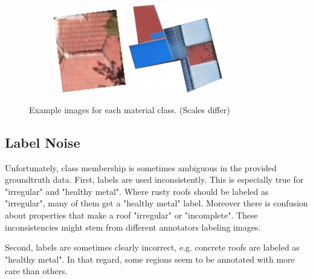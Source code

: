 \documentclass[11pt]{article}
\begin{document}
\begin{figure}
\begin{subfigure}[c]{0.32\textwidth}
		\end{subfigure}
		\begin{subfigure}[c]{0.32\textwidth}
			\centering
			\includegraphics[width=0.35\textwidth]{figures/mat_examples/other1.png}		
			\includegraphics[width=0.45\textwidth]{figures/mat_examples/other2.png}
		\end{subfigure}
	\caption{Example images for each material class. (Scales differ)}
	\label{fig:mat_examples}
	\end{figure}

	\subsection{Label Noise}
	\label{sec:data_noise}
	Unfortunately, class membership is sometimes ambiguous in the provided groundtruth data. 
	First, labels are used inconsistently. This is especially true for "irregular" and "healthy metal". Where rusty roofs should be labeled as "irregular", many of them get a "healthy metal" label.
	Moreover there is confusion about properties that make a roof "irregular" or "incomplete".
	These inconsistencies might stem from different annotators labeling images.
	
	Second, labels are sometimes clearly incorrect, e.g. concrete roofs are labeled as "healthy metal". In that regard, some regions seem to be annotated with more care than others. 
	
\end{document}
